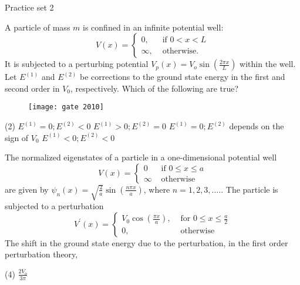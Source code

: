   \newpage
  \begin{abox}
  	Practice set 2
  	\end{abox}
  \begin{enumerate}
  	\begin{minipage}{\textwidth}
  	\item A particle of mass $m$ is confined in an infinite potential well:
  	$$
  	V(x)= \begin{cases}0, & \text { if } 0<x<L \\ \infty, & \text { otherwise. }\end{cases}
  	$$
  	It is subjected to a perturbing potential $V_{p}(x)=V_{o} \sin \left(\frac{2 \pi x}{L}\right)$ within the well. Let $E^{(1)}$ and $E^{(2)}$ be corrections to the ground state energy in the first and second order in $V_{0}$, respectively. Which of the following are true?
  	\begin{figure}[H]
  		\centering
  		\texttt{[image: gate 2010]}
  	\end{figure}
  \end{minipage}
  \begin{tasks}(2)
  	\task[\textbf{A.}]$E^{(1)}=0 ; E^{(2)}<0$
  	\task[\textbf{B.}]$E^{(1)}>0 ; E^{(2)}=0$
  	\task[\textbf{C.}]$E^{(1)}=0 ; E^{(2)}$ depends on the sign of $V_{0}$
  	\task[\textbf{D.}]$E^{(1)}<0 ; E^{(2)}<0$
  \end{tasks}
\begin{minipage}{\textwidth}
	\item The normalized eigenstates of a particle in a one-dimensional potential well
	$$
	V(x)= \begin{cases}0 & \text { if } 0 \leq x \leq a \\ \infty & \text { otherwise }\end{cases}
	$$
	are given by $\psi_{n}(x)=\sqrt{\frac{2}{a}} \sin \left(\frac{n \pi x}{a}\right)$, where $n=1,2,3, \ldots . .$
	The particle is subjected to a perturbation
	$$
	V^{\prime}(x)= \begin{cases}V_{0} \cos \left(\frac{\pi x}{a}\right), & \text { for } 0 \leq x \leq \frac{a}{2} \\ 0, & \text { otherwise }\end{cases}
	$$
	The shift in the ground state energy due to the perturbation, in the first order perturbation theory,
\end{minipage}
\begin{tasks}(4)
	\task[\textbf{A.}] $\frac{2 V_{o}}{3 \pi}$

\end{tasks}
\end{enumerate}
